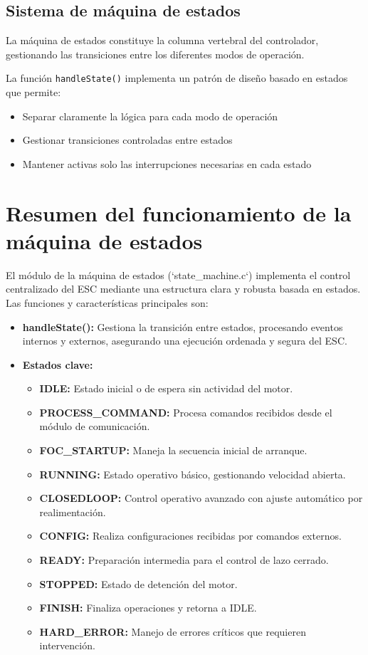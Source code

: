 \subsection{Sistema de máquina de estados}

La máquina de estados constituye la columna vertebral del controlador, gestionando las transiciones entre los diferentes modos de operación.

La función \texttt{handleState()} implementa un patrón de diseño basado en estados que permite:

\begin{itemize}
    \item Separar claramente la lógica para cada modo de operación
    \item Gestionar transiciones controladas entre estados
    \item Mantener activas solo las interrupciones necesarias en cada estado
\end{itemize}
\section{Resumen del funcionamiento de la máquina de estados}

El módulo de la máquina de estados (`state\_machine.c`) implementa el control centralizado del ESC mediante una estructura clara y robusta basada en estados. Las funciones y características principales son:

\begin{itemize}

\item \textbf{handleState():} Gestiona la transición entre estados, procesando eventos internos y externos, asegurando una ejecución ordenada y segura del ESC.

\item \textbf{Estados clave:}
\begin{itemize}
  \item \textbf{IDLE:} Estado inicial o de espera sin actividad del motor.
  \item \textbf{PROCESS\_COMMAND:} Procesa comandos recibidos desde el módulo de comunicación.
  \item \textbf{FOC\_STARTUP:} Maneja la secuencia inicial de arranque.
  \item \textbf{RUNNING:} Estado operativo básico, gestionando velocidad abierta.
  \item \textbf{CLOSEDLOOP:} Control operativo avanzado con ajuste automático por realimentación.
  \item \textbf{CONFIG:} Realiza configuraciones recibidas por comandos externos.
  \item \textbf{READY:} Preparación intermedia para el control de lazo cerrado.
  \item \textbf{STOPPED:} Estado de detención del motor.
  \item \textbf{FINISH:} Finaliza operaciones y retorna a IDLE.
  \item \textbf{HARD\_ERROR:} Manejo de errores críticos que requieren intervención.
\end{itemize}

\end{itemize}

